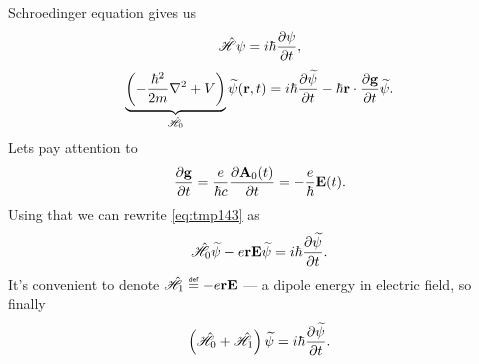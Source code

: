 Schroedinger equation gives us
\begin{equation}
	\hat{\mathscr{H}} \psi = i \hbar \dfrac{\partial {\psi}}{\partial {t}},
\end{equation}
\begin{equation}
	\underbrace{\left( - \frac{\hbar^2}{2m} \nabla^2 + V \right)}_{\hat{\mathscr{H}}_0} \widetilde{\psi} (\mathbf{r},t) = i \hbar \dfrac{\partial {\widetilde{\psi}}}{\partial {t}} - \hbar \mathbf{r} \cdot \dfrac{\partial {\mathbf{g}}}{\partial {t}} \widetilde{\psi}.
	\label{eq:tmp143}
\end{equation}
Lets pay attention to
\begin{equation}
	\dfrac{\partial {\mathbf{g}}}{\partial {t}} = \frac{e}{\hbar c} \dfrac{\partial {\mathbf{A}_0(t)}}{\partial {t}} = - \frac{e}{\hbar} \mathbf{E}(t).
\end{equation}
Using that we can rewrite \eqref{eq:tmp143} as
\begin{equation}
	\hat{\mathscr{H}}_0 \widetilde{\psi} - e \mathbf{r} \mathbf{E} \widetilde{\psi} = i \hbar \dfrac{\partial {\widetilde{\psi}}}{\partial {t}}.
\end{equation}
It's convenient to denote $\hat{\mathscr{H}}_1 \myeq - e \vec{r} \vec{E}$ --- a dipole energy in electric field, so finally
\begin{equation}
	\left( \hat{\mathscr{H}}_0 + \hat{\mathscr{H}}_1 \right) \widetilde{\psi} = i \hbar \dfrac{\partial {\widetilde{\psi}}}{\partial {t}}.
\end{equation}

